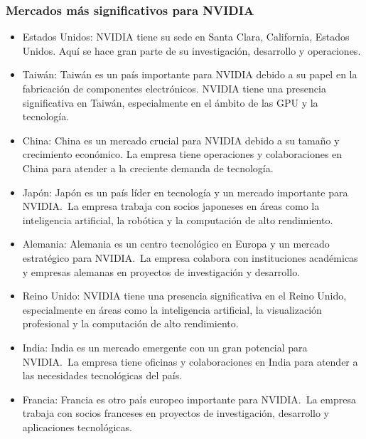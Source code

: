 \documentclass[conference]{IEEEtran}
\begin{document}
\subsubsection*{Mercados más significativos para NVIDIA}

\begin{itemize}
	\item Estados Unidos:
	      NVIDIA tiene su sede en Santa Clara, California,
	      Estados Unidos. Aquí se hace gran parte de su investigación,
	      desarrollo y operaciones.

	\item Taiwán:
	      Taiwán es un país importante para NVIDIA debido a su
	      papel en la fabricación de componentes electrónicos.
	      NVIDIA tiene una presencia significativa en Taiwán,
	      especialmente en el ámbito de las GPU y la tecnología.

	\item China:
	      China es un mercado crucial para NVIDIA debido a su
	      tamaño y crecimiento económico. La empresa tiene
	      operaciones y colaboraciones en China para atender a
	      la creciente demanda de tecnología.

	\item Japón:
	      Japón es un país líder en tecnología y un mercado
	      importante para NVIDIA.~La empresa trabaja con socios
	      japoneses en áreas como la inteligencia artificial,
	      la robótica y la computación de alto rendimiento.

	\item Alemania:
	      Alemania es un centro tecnológico en Europa y un
	      mercado estratégico para NVIDIA.~La empresa colabora
	      con instituciones académicas y empresas alemanas en
	      proyectos de investigación y desarrollo.

	\item Reino Unido:
	      NVIDIA tiene una presencia significativa en el Reino
	      Unido, especialmente en áreas como la inteligencia
	      artificial, la visualización profesional y la computación
	      de alto rendimiento.

	\item India:
	      India es un mercado emergente con un gran potencial
	      para NVIDIA.~La empresa tiene oficinas y colaboraciones
	      en India para atender a las necesidades tecnológicas del país.

	\item Francia:
	      Francia es otro país europeo importante para NVIDIA.~La
	      empresa trabaja con socios franceses en proyectos
	      de investigación, desarrollo y aplicaciones tecnológicas.

\end{itemize}
\end{document}
